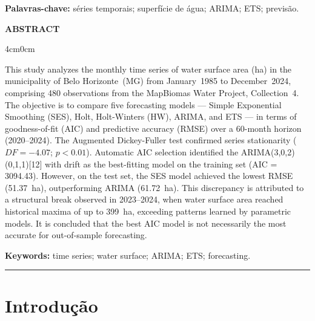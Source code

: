 \documentclass[12pt, a4paper]{article}
\begin{document}
\vspace{0.5em}
\noindent\textbf{Palavras-chave:} séries temporais; superfície de água; ARIMA; ETS; previsão.

\vspace{1em}

\begin{center}
  \textbf{ABSTRACT}
\end{center}
\begin{adjustwidth}{4cm}{0cm}
\begin{singlespace}
\small
This study analyzes the monthly time series of water surface area (ha) in the
municipality of Belo Horizonte~(MG) from January~1985 to December~2024,
comprising 480 observations from the MapBiomas Water Project, Collection~4.
The objective is to compare five forecasting models --- Simple Exponential
Smoothing (SES), Holt, Holt-Winters (HW), ARIMA, and ETS --- in terms of
goodness-of-fit (AIC) and predictive accuracy (RMSE) over a 60-month horizon
(2020--2024). The Augmented Dickey-Fuller test confirmed series stationarity
($DF = -4.07$; $p < 0.01$). Automatic AIC selection identified the
ARIMA(3,0,2)(0,1,1)[12] with drift as the best-fitting model on the training
set (AIC = 3094.43). However, on the test set, the SES model achieved the
lowest RMSE (51.37~ha), outperforming ARIMA (61.72~ha). This discrepancy is
attributed to a structural break observed in 2023--2024, when water surface
area reached historical maxima of up to 399~ha, exceeding patterns learned by
parametric models. It is concluded that the best AIC model is not necessarily
the most accurate for out-of-sample forecasting.
\end{singlespace}
\end{adjustwidth}

\vspace{0.5em}
\noindent\textbf{Keywords:} time series; water surface; ARIMA; ETS; forecasting.

\vspace{1.5em}
\hrule
\vspace{1.5em}

\section{Introdução}
\end{document}
